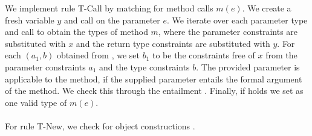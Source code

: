 %
We implement rule T-Call by matching for method calls $m(e)$.
We create a fresh variable $y$
and call  on the parameter $e$.
We iterate over each parameter type 
and call  to obtain
the types of method $m$,
where the parameter constraints are substituted with $x$
and the return type constraints are substituted with $y$.
For each $(a_1, b)$ obtained from ,
we set $b_1$ to be the constraints free of $x$
from the parameter constraints $a_1$
and the type constraints $b$.
The provided parameter is applicable to the method,
if the supplied parameter entails the formal argument of the method.
We check this through the entailment .
Finally, if  holds
we set  as one valid type of $m(e)$.\\
\\
For rule T-New, we check for object constructions .

